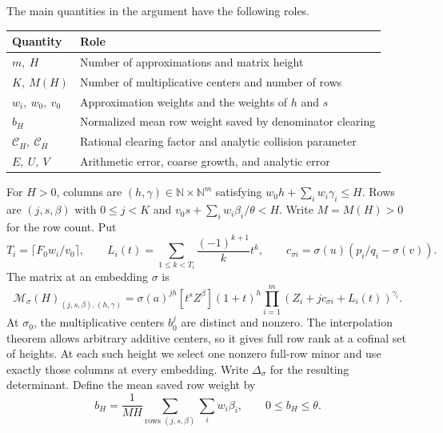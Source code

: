 \documentclass[11pt]{article}
\newcommand{\N}{\mathbb N}
\theoremstyle{remark}
\begin{document}
The main quantities in the argument have the following roles.
\begin{center}
\small
\begin{tabular}{@{}lp{}@{}}
\toprule
Quantity & Role \\
\midrule
$m,\ H$ & Number of approximations and matrix height \\
$K,\ M(H)$ & Number of multiplicative centers and number of rows \\
$w_i,\ w_0,\ v_0$ & Approximation weights and the weights of $h$ and $s$ \\
$b_H$ & Normalized mean row weight saved by denominator clearing \\
$\mathscr C_H,\ \mathcal C_H$ & Rational clearing factor and analytic collision parameter \\
$E,\ U,\ V$ & Arithmetic error, coarse growth, and analytic error \\
\bottomrule
\end{tabular}
\end{center}

For $H>0$, columns are $(h,\gamma)\in\N\times\N^m$ satisfying
$w_0h+\sum_iw_i\gamma_i\le H$. Rows are $(j,s,\beta)$ with
$0\le j<K$ and $v_0s+\sum_iw_i\beta_i/\theta<H$.
Write $M=M(H)>0$ for the row count. Put
\[
 T_i=\lceil F_0w_i/v_0\rceil,\qquad
 L_i(t)=\sum_{1\le k<T_i}\frac{(-1)^{k+1}}k t^k,
 \qquad c_{\sigma i}=\sigma(u)(p_i/q_i-\sigma(v)).
\]
The matrix at an embedding $\sigma$ is
\begin{equation}\label{eq:matrix}
 \mathcal M_\sigma(H)_{(j,s,\beta),(h,\gamma)}
 =\sigma(a)^{jh}[t^sZ^\beta](1+t)^h
     \prod_{i=1}^m(Z_i+jc_{\sigma i}+L_i(t))^{\gamma_i}.
\end{equation}
At $\sigma_0$, the multiplicative centers $b_0^j$ are distinct and
nonzero. The interpolation theorem allows arbitrary additive centers,
so it gives full row rank at a cofinal set of heights. At each such
height we select one nonzero full-row minor and use exactly those
columns at every embedding. Write $\Delta_\sigma$ for the resulting
determinant.
Define the mean saved row weight by
\[
 b_H=\frac1{MH}\sum_{\text{rows }(j,s,\beta)}\sum_iw_i\beta_i,
 \qquad 0\le b_H\le\theta.
\]
\end{document}
